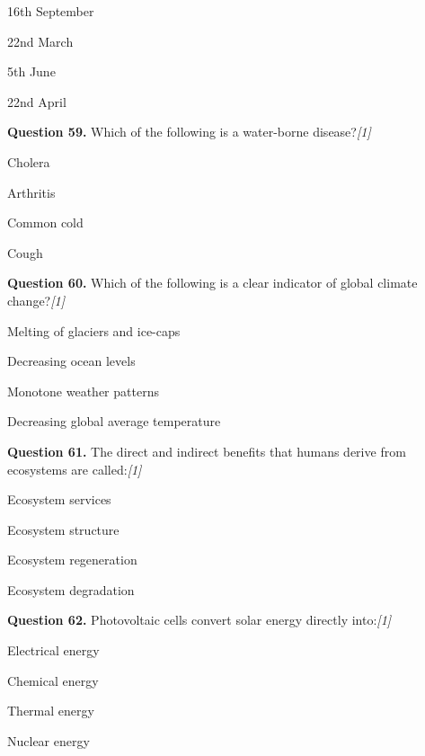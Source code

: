 \documentclass[11pt,a4paper]{article}
\newcommand{\pts}[1]{\hfill   \textit{[#1]}}
\begin{document}
\begin{parts}
  \item 16th September
  \item 22nd March
  \item 5th June
  \item 22nd April
\end{parts}

\medskip


\noindent   \textbf{Question 59.} Which of the following is a water-borne disease?\pts{1}

\begin{parts}
  \item Cholera
  \item Arthritis
  \item Common cold
  \item Cough
\end{parts}

\medskip


\noindent   \textbf{Question 60.} Which of the following is a clear indicator of global climate change?\pts{1}

\begin{parts}
  \item Melting of glaciers and ice-caps
  \item Decreasing ocean levels
  \item Monotone weather patterns
  \item Decreasing global average temperature
\end{parts}

\medskip


\noindent   \textbf{Question 61.} The direct and indirect benefits that humans derive from ecosystems are called:\pts{1}

\begin{parts}
  \item Ecosystem services
  \item Ecosystem structure
  \item Ecosystem regeneration
  \item Ecosystem degradation
\end{parts}

\medskip


\noindent   \textbf{Question 62.} Photovoltaic cells convert solar energy directly into:\pts{1}

\begin{parts}
  \item Electrical energy
  \item Chemical energy
  \item Thermal energy
  \item Nuclear energy
\end{parts}
\end{document}
